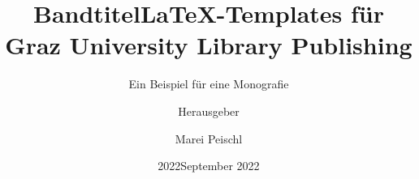 \documentclass[ngerman]{unigrazpub}%
\title{Bandtitel}
\author{Herausgeber}
\date{2022}
\begin{document}
\author{Marei Peischl}
\title{\LaTeX-Templates für Graz University Library Publishing}
\subtitle{Ein Beispiel für eine Monografie}
\date{September 2022}



\maketitle


\tableofcontents



\appendix

\printbibliography
\end{document}
